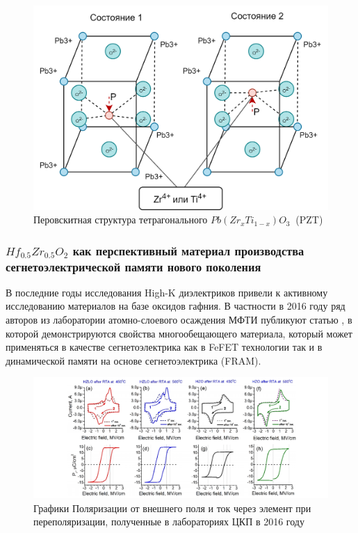 \documentclass[a4paper,12pt]{article} %
\begin{document}
\begin{figure}[H]
  \includegraphics[width=\linewidth]{state-Segneto.png}
  \caption{Перовскитная структура тетрагонального $Pb (Zr_x Ti_{1-x}) O_3 \ $ (PZT) }
  \label{state-Seqneto}
\end{figure}




\subsubsection{$Hf_{0.5}Zr_{0.5}O_2$ как перспективный материал производства сегнетоэлектрической памяти нового поколения}

В последние годы исследования High-K диэлектриков привели к активному исследованию материалов на базе оксидов гафния. В частности в 2016 году ряд авторов из лаборатории атомно-слоевого осаждения МФТИ публикуют статью \cite{Segneto_MIPT-I}, в которой демонстрируются свойства многообещающего материала, который может применяться в качестве сегнетоэлектрика как в FeFET технологии так и в динамической памяти на основе сегнетоэлектрика (FRAM). 

\begin{figure}
  \includegraphics[width=\linewidth]{segneto-graph.png}
  \caption{Графики Поляризации от внешнего поля и ток через элемент при переполяризации, полученные в лабораториях ЦКП в 2016 году \cite{Segneto_MIPT-I} }
  \label{SegDataFig}
\end{figure}
\end{document}
